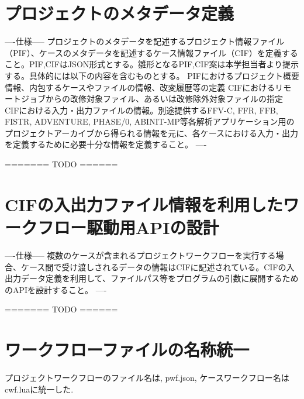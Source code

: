 \documentclass[a4paper,10pt,oneside]{jsbook}
\begin{document}
\section{プロジェクトのメタデータ定義}
----仕様-----
プロジェクトのメタデータを記述するプロジェクト情報ファイル（PIF）、ケースのメタデータを記述するケース情報ファイル（CIF）を定義すること。PIF,CIFはJSON形式とする。雛形となるPIF,CIF案は本学担当者より提示する。具体的には以下の内容を含むものとする。
PIFにおけるプロジェクト概要情報、内包するケースやファイルの情報、改変履歴等の定義
CIFにおけるリモートジョブからの改修対象ファイル、あるいは改修除外対象ファイルの指定
CIFにおける入力・出力ファイルの情報。別途提供するFFV-C, FFR, FFB, FISTR, ADVENTURE, PHASE/0, ABINIT-MP等各解析アプリケーション用のプロジェクトアーカイブから得られる情報を元に、各ケースにおける入力・出力を定義するために必要十分な情報を定義すること。
----

=======
TODO
======


\section{CIFの入出力ファイル情報を利用したワークフロー駆動用APIの設計}
----仕様-----
複数のケースが含まれるプロジェクトワークフローを実行する場合、ケース間で受け渡しされるデータの情報はCIFに記述されている。CIFの入出力データ定義を利用して、ファイルパス等をプログラムの引数に展開するためのAPIを設計すること。
----

=======
TODO
======


\section{ワークフローファイルの名称統一}
プロジェクトワークフローのファイル名は, pwf.json, ケースワークフロー名は cwf.luaに統一した.
\end{document}
